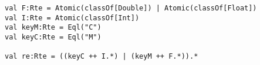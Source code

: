 \begin{lstlisting}[style=scalaioScala]
val F:Rte = Atomic(classOf[Double]) | Atomic(classOf[Float])
val I:Rte = Atomic(classOf[Int])
val keyM:Rte = Eql("C")
val keyC:Rte = Eql("M")

val re:Rte = ((keyC ++ I.*) | (keyM ++ F.*)).*
\end{lstlisting}
